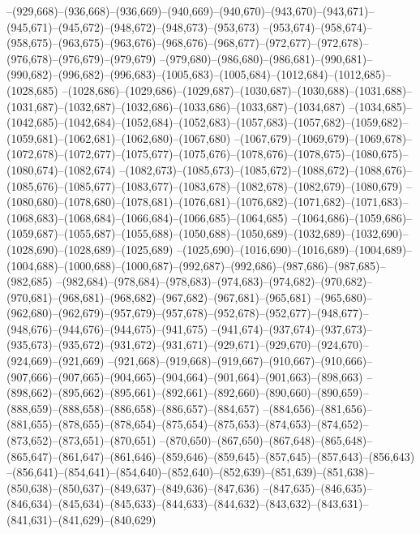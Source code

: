 --(929,668)--(936,668)--(936,669)--(940,669)--(940,670)--(943,670)--(943,671)--(945,671)--(945,672)--(948,672)--(948,673)--(953,673)
--(953,674)--(958,674)--(958,675)--(963,675)--(963,676)--(968,676)--(968,677)--(972,677)--(972,678)--(976,678)--(976,679)--(979,679)
--(979,680)--(986,680)--(986,681)--(990,681)--(990,682)--(996,682)--(996,683)--(1005,683)--(1005,684)--(1012,684)--(1012,685)--(1028,685)
--(1028,686)--(1029,686)--(1029,687)--(1030,687)--(1030,688)--(1031,688)--(1031,687)--(1032,687)--(1032,686)--(1033,686)--(1033,687)--(1034,687)
--(1034,685)--(1042,685)--(1042,684)--(1052,684)--(1052,683)--(1057,683)--(1057,682)--(1059,682)--(1059,681)--(1062,681)--(1062,680)--(1067,680)
--(1067,679)--(1069,679)--(1069,678)--(1072,678)--(1072,677)--(1075,677)--(1075,676)--(1078,676)--(1078,675)--(1080,675)--(1080,674)--(1082,674)
--(1082,673)--(1085,673)--(1085,672)--(1088,672)--(1088,676)--(1085,676)--(1085,677)--(1083,677)--(1083,678)--(1082,678)--(1082,679)--(1080,679)
--(1080,680)--(1078,680)--(1078,681)--(1076,681)--(1076,682)--(1071,682)--(1071,683)--(1068,683)--(1068,684)--(1066,684)--(1066,685)--(1064,685)
--(1064,686)--(1059,686)--(1059,687)--(1055,687)--(1055,688)--(1050,688)--(1050,689)--(1032,689)--(1032,690)--(1028,690)--(1028,689)--(1025,689)
--(1025,690)--(1016,690)--(1016,689)--(1004,689)--(1004,688)--(1000,688)--(1000,687)--(992,687)--(992,686)--(987,686)--(987,685)--(982,685)
--(982,684)--(978,684)--(978,683)--(974,683)--(974,682)--(970,682)--(970,681)--(968,681)--(968,682)--(967,682)--(967,681)--(965,681)
--(965,680)--(962,680)--(962,679)--(957,679)--(957,678)--(952,678)--(952,677)--(948,677)--(948,676)--(944,676)--(944,675)--(941,675)
--(941,674)--(937,674)--(937,673)--(935,673)--(935,672)--(931,672)--(931,671)--(929,671)--(929,670)--(924,670)--(924,669)--(921,669)
--(921,668)--(919,668)--(919,667)--(910,667)--(910,666)--(907,666)--(907,665)--(904,665)--(904,664)--(901,664)--(901,663)--(898,663)
--(898,662)--(895,662)--(895,661)--(892,661)--(892,660)--(890,660)--(890,659)--(888,659)--(888,658)--(886,658)--(886,657)--(884,657)
--(884,656)--(881,656)--(881,655)--(878,655)--(878,654)--(875,654)--(875,653)--(874,653)--(874,652)--(873,652)--(873,651)--(870,651)
--(870,650)--(867,650)--(867,648)--(865,648)--(865,647)--(861,647)--(861,646)--(859,646)--(859,645)--(857,645)--(857,643)--(856,643)
--(856,641)--(854,641)--(854,640)--(852,640)--(852,639)--(851,639)--(851,638)--(850,638)--(850,637)--(849,637)--(849,636)--(847,636)
--(847,635)--(846,635)--(846,634)--(845,634)--(845,633)--(844,633)--(844,632)--(843,632)--(843,631)--(841,631)--(841,629)--(840,629)
